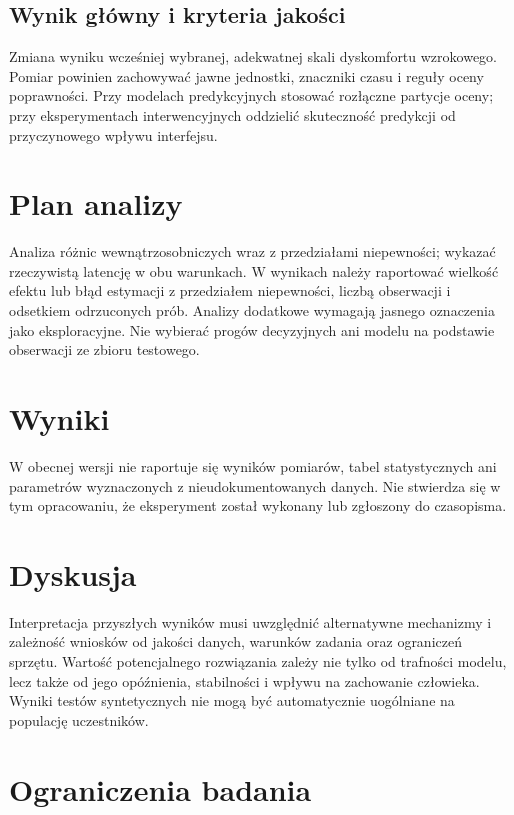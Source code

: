 \documentclass[11pt,a4paper]{article}
\begin{document}
\subsection{Wynik główny i kryteria jakości}

Zmiana wyniku wcześniej wybranej, adekwatnej skali dyskomfortu wzrokowego. Pomiar powinien zachowywać jawne jednostki, znaczniki czasu i reguły oceny poprawności. Przy modelach predykcyjnych stosować rozłączne partycje oceny; przy eksperymentach interwencyjnych oddzielić skuteczność predykcji od przyczynowego wpływu interfejsu.

\section{Plan analizy}

Analiza różnic wewnątrzosobniczych wraz z przedziałami niepewności; wykazać rzeczywistą latencję w obu warunkach. W wynikach należy raportować wielkość efektu lub błąd estymacji z przedziałem niepewności, liczbą obserwacji i odsetkiem odrzuconych prób. Analizy dodatkowe wymagają jasnego oznaczenia jako eksploracyjne. Nie wybierać progów decyzyjnych ani modelu na podstawie obserwacji ze zbioru testowego.

\section{Wyniki}

W obecnej wersji nie raportuje się wyników pomiarów, tabel statystycznych ani parametrów wyznaczonych z nieudokumentowanych danych. Nie stwierdza się w tym opracowaniu, że eksperyment został wykonany lub zgłoszony do czasopisma.

\section{Dyskusja}

Interpretacja przyszłych wyników musi uwzględnić alternatywne mechanizmy i zależność wniosków od jakości danych, warunków zadania oraz ograniczeń sprzętu. Wartość potencjalnego rozwiązania zależy nie tylko od trafności modelu, lecz także od jego opóźnienia, stabilności i wpływu na zachowanie człowieka. Wyniki testów syntetycznych nie mogą być automatycznie uogólniane na populację uczestników.

\section{Ograniczenia badania}
\end{document}
